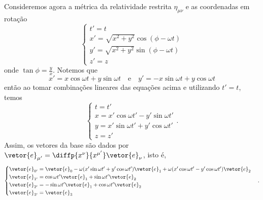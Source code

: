 Consideremos agora a métrica da relatividade restrita \(\eta_{\mu\nu}\) e as coordenadas em rotação
\begin{equation*}
    \begin{cases}
        t' = t\\
        x' = \sqrt{x^2 + y^2}\cos{(\phi - \omega t)}\\
        y' = \sqrt{x^2 + y^2}\sin{(\phi - \omega t)}\\
        z' = z
    \end{cases}
\end{equation*}
onde \(\tan\phi = \frac{y}{x}\). Notemos que
\begin{equation*}
    x' = x\cos{\omega t} + y\sin{\omega t}\quad\text{e}\quad y' = -x\sin{\omega t} + y\cos{\omega t}
\end{equation*}
então ao tomar combinações lineares das equações acima e utilizando \(t' = t\), temos
\begin{equation*}
    \begin{cases}
        t = t'\\
        x = x' \cos{\omega t'} - y' \sin{\omega t'}\\
        y = x'\sin{\omega t'} + y' \cos{\omega t'}\\
        z = z'
    \end{cases}.
\end{equation*}
Assim, os vetores da base são dados por \(\vetor{e}_{\mu'} = \diffp{x^\nu}{x^{\mu'}}\vetor{e}_{\nu}\), isto é,
\begin{equation*}
    \begin{cases}
        \vetor{e}_{0'} = \vetor{e}_0 - \omega(x' \sin{\omega t'} + y' \cos{\omega t'})\vetor{e}_1 + \omega(x' \cos{\omega t'} - y'\cos{\omega t'})\vetor{e}_2\\
        \vetor{e}_{1'} = \cos{\omega t'} \vetor{e}_1 + \sin{\omega t'} \vetor{e}_2\\
        \vetor{e}_{2'} = -\sin{\omega t'} \vetor{e}_1 + \cos{\omega t'} \vetor{e}_2\\
        \vetor{e}_{3'} = \vetor{e}_3
    \end{cases}.
\end{equation*}

